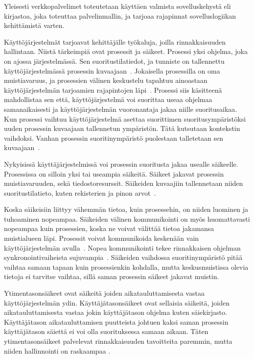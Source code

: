 \documentclass[12pt]{article}
\begin{document}
Yleisesti verkkopalvelimet toteutetaan käyttäen valmista sovelluskehystä eli kirjastoa,
joka toteuttaa palvelinmallin, ja tarjoaa rajapinnat sovelluslogiikan
kehittämistä varten.

Käyttöjärjestelmät tarjoavat kehittäjälle työkaluja, joilla rinnakkaisuuden hallintaan.
Niistä tärkeimpiä ovat prosessit ja säikeet.
Prosessi yksi ohjelma, joka on ajossa järjestelmässä. Sen suoritustilatiedot, ja tunniste on
tallennettu käyttöjärjestelmässä prosessin kuvaajaan~\cite{stallings_operating_2018}.
Jokaisella
prosessilla on oma muistiavaruus, ja prosessien välinen keskustelu
tapahtuu ainoastaan käyttöjärjestelmän tarjoamien rajapintojen läpi~\cite{stallings_operating_2018}.
Prosessi siis käsitteenä mahdollistaa sen että, käyttöjärjestelmä
voi suorittaa useaa ohjelmaa samanaikaisesti ja käyttöjärjestelmän
vuoronantaja jakaa niille suoritusaikaa. Kun prosessi vaihtuu
käyttöjärjestelmä asettaa suorittimen suoritusympäristöksi
uuden prosessin kuvaajaan tallennetun ympäristön. Tätä kutsutaan kontekstin
vaihdoksi. Vanhan prosessin suoritinympäristö puolestaan talletetaan sen 
kuvaajaan~\cite{stallings_operating_2018}.

Nykyisissä käyttäjärjestelmissä voi prosessin suoritusta jakaa usealle
säikeelle. Prosessissa on silloin yksi tai useampia säikeitä.
Säikeet jakavat prosessin muistiavaruuden, sekä tiedostoresurssit.
Säikeiden kuvaajiin
tallennetaan niiden suoritustilatieto,
kuten rekisterien ja pinon arvot~\cite{stallings_operating_2018}.

Koska säikeisiin liittyy vähemmän tietoa, kuin prosessehin,
on niiden luominen ja tuhoaminen nopeampaa. Säikeiden välinen
kommunikointi on myös huomattavasti nopeampaa kuin prosessien, koska
ne voivat välittää tietoa jakamansa muistialueen läpi.
Prosessit voivat kommunikoida keskenään vain käyttöjärjestelmän 
avulla~\cite{stallings_operating_2018}.
Nopea
kommunikointi tekee rinnakkaisen ohjelman synkronointivaiheista
sujuvampia~\cite{stallings_operating_2018}. Säikeiden vaihdossa suoritinympäristö pitää vaihtaa 
samaan tapaan kuin prosessienkin kohdalla, mutta keskusmuistissa olevia
tietoja ei tarvitse vaihtaa, sillä saman prosessin säikeet jakavat
muistin.

Ytimentasonsäikeet ovat säikeitä joiden aikatauluttamisesta vastaa
käyttöjärjestelmän ydin. Käyttäjätasonsäikeet ovat sellaisia säikeitä,
joiden aikatauluttamisesta vastaa jokin käyttäjätason ohjelma kuten
säiekirjasto. Käyttäjätason aikatauluttamisen puutteista johtuen
kaksi saman prosessin käyttäjätason säiettä ei voi olla suorituksessa
samaan aikaan. Täten ytimentasonsäikeet palvelevat rinnakkaisuuden tavoitteita
paremmin, mutta niiden hallinnointi on raskaampaa \cite{stallings_operating_2018}.
\end{document}
